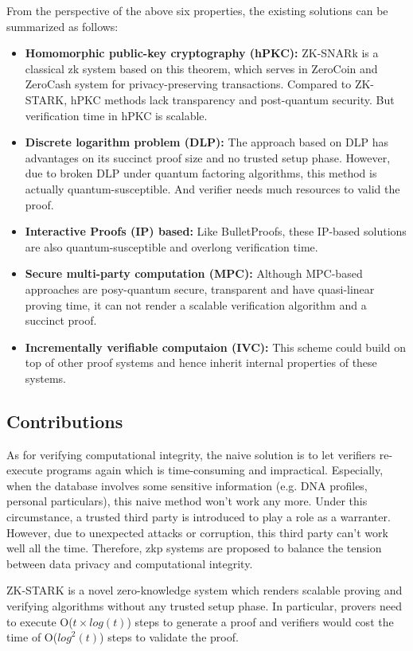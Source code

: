 \documentclass[conference]{IEEEtran}
\begin{document}
From the perspective of the above six properties, the existing solutions can be summarized as follows:

\begin{itemize}
    \item \textbf{Homomorphic public-key cryptography (hPKC):} ZK-SNARk is a classical zk system based on this theorem, which serves in ZeroCoin and ZeroCash system for privacy-preserving transactions.
    Compared to ZK-STARK, hPKC methods lack transparency and post-quantum security. But verification time in hPKC is scalable. 
    \item \textbf{Discrete logarithm problem (DLP):} The approach based on DLP has advantages on its succinct proof size and no trusted setup phase.
    However, due to broken DLP under quantum factoring algorithms, this method is actually quantum-susceptible. And verifier needs much resources to valid the proof.  
    \item \textbf{Interactive Proofs (IP) based:} Like BulletProofs, these IP-based solutions are also quantum-susceptible and overlong verification time.
    \item \textbf{Secure multi-party computation (MPC):} Although MPC-based approaches are posy-quantum secure, transparent and have quasi-linear proving time, it can not render a scalable verification algorithm and a succinct proof.
    \item \textbf{Incrementally verifiable computaion (IVC):} This scheme could build on top of other proof systems and hence inherit internal properties of these systems.
\end{itemize}

\subsection{Contributions}
As for verifying computational integrity, the naive solution is to let verifiers re-execute programs again which is time-consuming and impractical.
%
Especially, when the database involves some sensitive information (e.g. DNA profiles, personal particulars), this naive method won't work any more.
%
Under this circumstance, a trusted third party is introduced to play a role as a warranter.
%
However, due to unexpected attacks or corruption, this third party can't work well all the time.
%
Therefore, zkp systems are proposed to balance the tension between data privacy and computational integrity.

ZK-STARK is a novel zero-knowledge system which renders scalable proving and verifying algorithms without any trusted setup phase.
%
In particular, provers need to execute O($t{\times}log(t)$) steps to generate a proof and verifiers would cost the time of O(${log}^2(t)$) steps to validate the proof.
\end{document}
